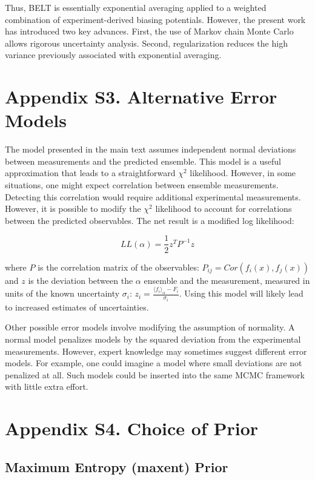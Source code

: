 \documentclass[12pt]{article}
\begin{document}
Thus, BELT is essentially exponential averaging applied to a weighted combination of experiment-derived biasing potentials.  However, the present work has introduced two key advances.  First, the use of Markov chain Monte Carlo allows rigorous uncertainty analysis.  Second, regularization reduces the high variance previously associated with exponential averaging.  

\newpage

\section*{Appendix S3.  Alternative Error Models}

The model presented in the main text assumes independent normal deviations between measurements and the predicted ensemble.  This model is a useful approximation that leads to a straightforward $\chi^2$ likelihood.  However, in some situations, one might expect correlation between ensemble measurements.  Detecting this correlation would require additional experimental measurements.  However, it is possible to modify the $\chi^2$ likelihood to account for correlations between the predicted observables.  The net result is a modified log likelihood:

$$L L(\alpha) = \frac{1}{2} z^T P^{-1} z$$

where $P$ is the correlation matrix of the observables: $P_{ij} = Cor(f_i(x), f_j(x))$ and $z$ is the deviation between the $\alpha$ ensemble and the measurement, measured in units of the known uncertainty $\sigma_i$: $z_i = \frac{\langle f_i\rangle _\alpha - F_i}{\sigma_i}$.  Using this model will likely lead to increased estimates of uncertainties.  

Other possible error models involve modifying the assumption of normality.  A normal model penalizes models by the squared deviation from the experimental measurements.  However, expert knowledge may sometimes suggest different error models.  For example, one could imagine a model where small deviations are not penalized at all.  Such models could be inserted into the same MCMC framework with little extra effort.

\newpage

\section*{Appendix S4.  Choice of Prior}

\subsection*{Maximum Entropy (maxent) Prior}
\end{document}
